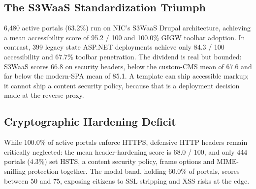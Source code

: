 \documentclass[conference]{IEEEtran}
\begin{document}
\begin{table}[htbp]
\caption{Audit Breakdown Across Governance Tiers}
\label{tab:governance}
\centering
{}
\end{table}

\subsection{The S3WaaS Standardization Triumph}
6,480 active portals (63.2\%) run on NIC's S3WaaS Drupal architecture, achieving a mean accessibility score of 95.2 / 100 and 100.0\% GIGW toolbar adoption. In contrast, 399 legacy state ASP.NET deployments achieve only 84.3 / 100 accessibility and 67.7\% toolbar penetration. The dividend is real but bounded: S3WaaS scores 66.8 on security headers, below the custom-CMS mean of 67.6 and far below the modern-SPA mean of 85.1. A template can ship accessible markup; it cannot ship a content security policy, because that is a deployment decision made at the reverse proxy.

\subsection{Cryptographic Hardening Deficit}
While 100.0\% of active portals enforce HTTPS, defensive HTTP headers remain critically neglected: the mean header-hardening score is 68.0 / 100, and only 444 portals (4.3\%) set HSTS, a content security policy, frame options and MIME-sniffing protection together. The modal band, holding 60.0\% of portals, scores between 50 and 75, exposing citizens to SSL stripping and XSS risks at the edge.
\end{document}
